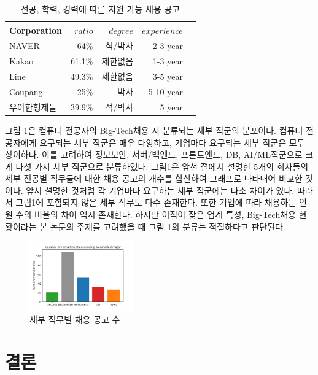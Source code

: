 \documentclass{pnu-survey}
\begin{document}
\begin{table}[!pt]
\centering
\setlength{\belowcaptionskip}{5pt}
\caption{전공, 학력, 경력에 따른 지원 가능 채용 공고}
\label{tab:datasets}
\begin{tabular}{@{}lrrrr@{}} 
\toprule
{\bfseries Corporation} & $ratio$ & $degree$ & $experience$ \\
\midrule
NAVER			&64\%	    &석/박사	    & 2-3 year\\
Kakao   		&61.1\%		&제한없음	& 1-3 year\\
Line    		&49.3\%   	&제한없음	& 3-5 year\\
Coupang			&25\%     	&박사      	&5-10 year\\
우아한형제들		&39.9\%		&석/박사    	&   5 year\\
\bottomrule
\end{tabular}
\end{table}

그림 1은 컴퓨터 전공자의 Big-Tech채용 시 분류되는 세부 직군의 분포이다. 컴퓨터 전공자에게 요구되는 세부 직군은 매우 다양하고, 기업마다 요구되는 세부 직군은 모두 상이하다. 이를 고려하여 정보보안, 서버/백엔드, 프론트엔드, DB, AI/ML직군으로 크게 다섯 가지 세부 직군으로 분류하였다. 그림1은 앞선 절에서 설명한 5개의 회사들의 세부 전공별 직무들에 대한 채용 공고의 개수를 합산하여 그래프로 나타내어 비교한 것이다. 앞서 설명한 것처럼 각 기업마다 요구하는 세부 직군에는 다소 차이가 있다. 따라서 그림1에 포함되지 않은 세부 직무도 다수 존재한다. 또한 기업에 따라 채용하는 인원 수의 비율의 차이 역시 존재한다. 하지만 이직이 잦은 업계 특성, Big-Tech채용 현황이라는 본 논문의 주제를 고려했을 때 그림 1의 분류는 적절하다고 판단된다.

\begin{figure}[hb]
\centering
\includegraphics[width=0.4\textwidth]{img/fig1.png}
\caption{세부 직무별 채용 공고 수}
\label{fig:example1}
\end{figure}

\section{결론}
\end{document}
